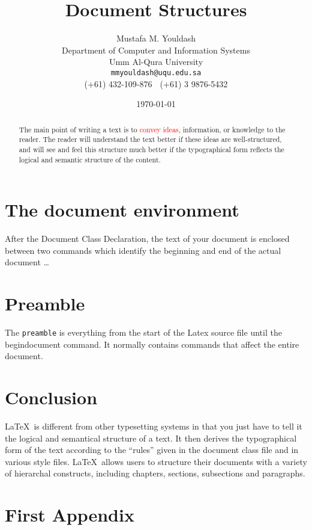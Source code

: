 \documentclass[12pt,oneside,onecolumn,a4paper,final]{article}
\begin{document}
	\title{Document Structures}
	\author{Mustafa M. Youldash \\
		Department of Computer and Information Systems \\
		Umm Al-Qura University \\
		\texttt{mmyouldash@uqu.edu.sa} \\
		(+61) 432-109-876 $\;$ (+61) 3 9876-5432}
	\date{\today}
	\maketitle

	\begin{abstract}
		The main point of writing a text is to \textcolor{red}{convey ideas}, information, or knowledge to the reader. The reader will understand the text better if these ideas are well-structured, and will see and feel this structure much better if the typographical form reflects the logical and semantic structure of the content.
	\end{abstract}

	\section{The document environment}
	After the Document Class Declaration, the text of your document is enclosed between two commands which identify the beginning and end of the actual document \ldots

	\section{Preamble}
	The \texttt{preamble} is everything from the start of the Latex source file until the \\begin{document} command. It normally contains commands that affect the entire document.

	\section{Conclusion}
	\LaTeX\ is different from other typesetting systems in that you just have to tell it the logical and semantical structure of a text. It then derives the typographical form of the text according to the ``rules'' given in the document class file and in various style files. \LaTeX\ allows users to structure their documents with a variety of hierarchal constructs, including chapters, sections, subsections and paragraphs.

	\appendix
	\section{First Appendix}
\end{document}
